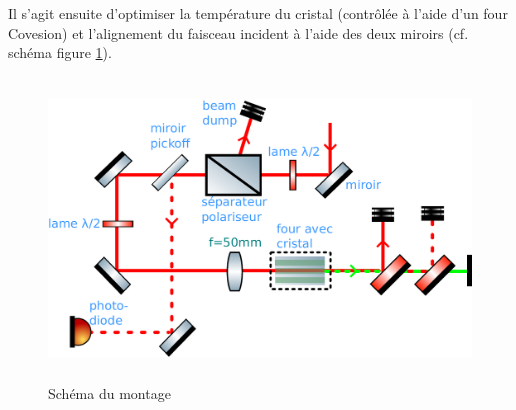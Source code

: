 \documentclass[11pt,a4paper] { article}
\begin{document}
Il s'agit ensuite d'optimiser la température du cristal (contrôlée à l'aide d'un four Covesion) et l'alignement du faisceau incident à l'aide des deux miroirs (cf. schéma figure \ref{fig:montage}). 

\begin{figure}[h]
	\centering
	\includegraphics[height=8cm]{./img/schema.pdf}
	\caption{Schéma du montage}
	\label{fig:montage}
\end{figure}
\end{document}
